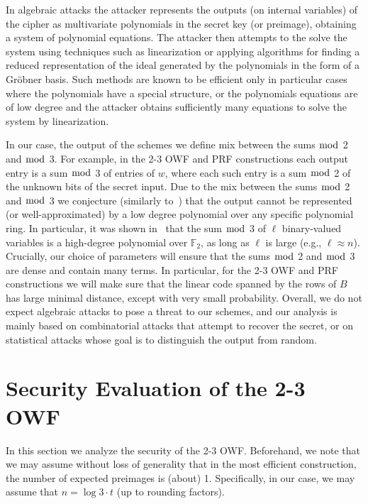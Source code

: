 \documentclass[orivec,envcountsect]{llncs}
\begin{document}
In algebraic attacks the attacker represents the outputs (on internal variables) of the cipher as multivariate polynomials in the secret key (or preimage), obtaining a system of polynomial equations. The attacker then attempts to the solve the system using techniques such as linearization or applying algorithms for finding a reduced representation of the ideal generated by the polynomials in the form of a Gr\"{o}bner basis.
Such methods are known to be efficient only in particular cases where the polynomials have a special structure, or the
polynomials equations are of low degree and the attacker obtains sufficiently many equations to solve the system by linearization.

In our case, the output of the schemes we define
mix between the sums $\bmod$ 2 and $\bmod$ 3.
For example, in the 2-3 OWF and PRF constructions each output entry is a sum $\bmod$ 3 of entries of $w$,
where each such entry is a sum $\bmod$ 2 of the unknown bits of the secret input.
Due to the mix between the sums $\bmod$ 2 and $\bmod$ 3 we conjecture (similarly to~\cite{BonehIPSW18}) that
the output cannot be represented (or well-approximated) by a low degree polynomial over any specific polynomial ring.
In particular, it was shown in~\cite{BonehIPSW18} that the sum $\bmod$ 3 of $\ell$ binary-valued variables is
a high-degree polynomial over $\mathbb{F}_2$,
as long as $\ell$ is large (e.g., $\ell \approx n$).
Crucially, our choice of parameters will ensure that the sums $\bmod$ 2 and $\bmod$ 3
are dense and contain many terms.
In particular, for the
2-3 OWF and PRF constructions
we will make sure that the linear code spanned by the rows of $B$ has large minimal distance,
except with very small probability.
Overall, we do not expect algebraic attacks to pose a threat to our schemes,
and our analysis is mainly based on combinatorial attacks that attempt to recover the secret,
or on statistical attacks whose goal is to distinguish the output from random.


\section{Security Evaluation of the 2-3 OWF}

In this section we analyze the security of the 2-3 OWF.
Beforehand, we note that we may assume without loss of generality that in the most efficient construction, the number of expected preimages is (about) 1. Specifically, in our case, we may assume that $n = \log 3 \cdot t$ (up to rounding factors).
\end{document}
